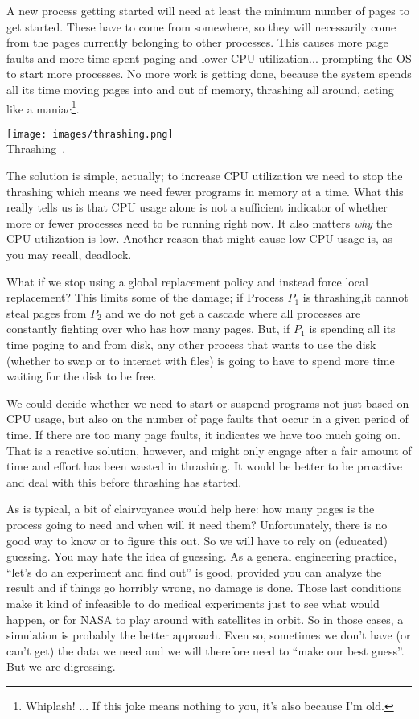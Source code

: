 A new process getting started will need at least the minimum number of pages to get started. These have to come from somewhere, so they will necessarily come from the pages currently belonging to other processes. This causes more page faults and more time spent paging and lower CPU utilization... prompting the OS to start more processes. No more work is getting done, because the system spends all its time moving pages into and out of memory, thrashing all around, acting like a maniac\footnote{Whiplash! ... If this joke means nothing to you, it's also because I'm old.}.

\begin{center}
\texttt{[image: images/thrashing.png]}\\
Thrashing~\cite{osc}.
\end{center}

The solution is simple, actually; to increase CPU utilization we need to stop the thrashing which means we need fewer programs in memory at a time. What this really tells us is that CPU usage alone is not a sufficient indicator of whether more or fewer processes need to be running right now. It also matters \textit{why} the CPU utilization is low. Another reason that might cause low CPU usage is, as you may recall, deadlock. 

 What if we stop using a global replacement policy and instead force local replacement? This limits some of the damage; if Process $P_{1}$ is thrashing,it cannot steal pages from $P_{2}$ and we do not get a cascade where all processes are constantly fighting over who has how many pages. But, if $P_{1}$ is spending all its time paging to and from disk, any other process that wants to use the disk (whether to swap or to interact with files) is going to have to spend more time waiting for the disk to be free.  
 
We could decide whether we need to start or suspend programs not just based on CPU usage, but also on the number of page faults that occur in a given period of time. If there are too many page faults, it indicates we have too much going on. That is a reactive solution, however, and might only engage after a fair amount of time and effort has been wasted in thrashing. It would be better to be proactive and deal with this before thrashing has started.
 
As is typical, a bit of clairvoyance would help here: how many pages is the process going to need and when will it need them? Unfortunately, there is no good way to know or to figure this out. So we will have to rely on (educated) guessing. You may hate the idea of guessing. As a general engineering practice, ``let's do an experiment and find out'' is good, provided you can analyze the result and if things go horribly wrong, no damage is done. Those last conditions make it kind of infeasible to do medical experiments just to see what would happen, or for NASA to play around with satellites in orbit. So in those cases, a simulation is probably the better approach. Even so, sometimes we don't have (or can't get) the data we need and we will therefore need to ``make our best guess''. But we are digressing.

